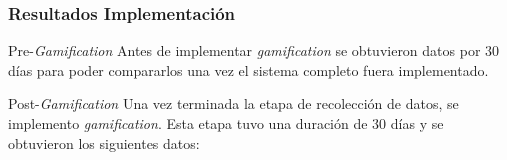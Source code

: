 \documentclass[10pt, compress]{beamer}
\begin{document}
\begin{frame}
 \frametitle{Resultados Implementación}

\begin{block}{Pre-\emph{Gamification}}
Antes de implementar \emph{gamification} se obtuvieron datos por $30$ días para poder
compararlos una vez el sistema completo fuera implementado.
\end{block}


\begin{block}{Post-\emph{Gamification}}
Una vez terminada la etapa de recolección de datos, se implemento \emph{gamification}. Esta
etapa tuvo una duración de $30$ días y se obtuvieron los siguientes datos:
\end{block}


\end{frame}
\end{document}
